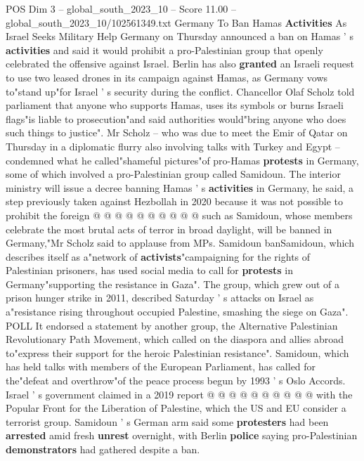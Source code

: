 \begin{textsample}{POS Dim 3 – global\_south\_2023\_10 – Score 11.00 – global\_south\_2023\_10/102561349.txt}  \label{ex:f3_pos_430}
Germany To Ban Hamas \textbf{Activities} As Israel Seeks Military Help Germany on Thursday announced a ban on Hamas ' s \textbf{activities} and said it would prohibit a pro-Palestinian group that openly celebrated the offensive against Israel.
Berlin has also \textbf{granted} an Israeli request to use two leased drones in its campaign against Hamas, as Germany vows to"stand up"for Israel ' s security during the conflict.
Chancellor Olaf Scholz told parliament that anyone who supports Hamas, uses its symbols or burns Israeli flags"is liable to prosecution"and said authorities would"bring anyone who does such things to justice".
Mr Scholz -- who was due to meet the Emir of Qatar on Thursday in a diplomatic flurry also involving talks with Turkey and Egypt -- condemned what he called"shameful pictures"of pro-Hamas \textbf{protests} in Germany, some of which involved a pro-Palestinian group called Samidoun.
The interior ministry will issue a decree banning Hamas ' s \textbf{activities} in Germany, he said, a step previously taken against Hezbollah in 2020 because it was not possible to prohibit the foreign @ @ @ @ @ @ @ @ @ @ such as Samidoun, whose members celebrate the most brutal acts of terror in broad daylight, will be banned in Germany,"Mr Scholz said to applause from MPs.
Samidoun banSamidoun, which describes itself as a"network of \textbf{activists}"campaigning for the rights of Palestinian prisoners, has used social media to call for \textbf{protests} in Germany"supporting the resistance in Gaza".
The group, which grew out of a prison hunger strike in 2011, described Saturday ' s attacks on Israel as a"resistance rising throughout occupied Palestine, smashing the siege on Gaza".
POLL It endorsed a statement by another group, the Alternative Palestinian Revolutionary Path Movement, which called on the diaspora and allies abroad to"express their support for the heroic Palestinian resistance".
Samidoun, which has held talks with members of the European Parliament, has called for the"defeat and overthrow"of the peace process begun by 1993 ' s Oslo Accords.
Israel ' s government claimed in a 2019 report @ @ @ @ @ @ @ @ @ @ with the Popular Front for the Liberation of Palestine, which the US and EU consider a terrorist group.
Samidoun ' s German arm said some \textbf{protesters} had been \textbf{arrested} amid fresh \textbf{unrest} overnight, with Berlin \textbf{police} saying pro-Palestinian \textbf{demonstrators} had gathered despite a ban.

\end{textsample}
